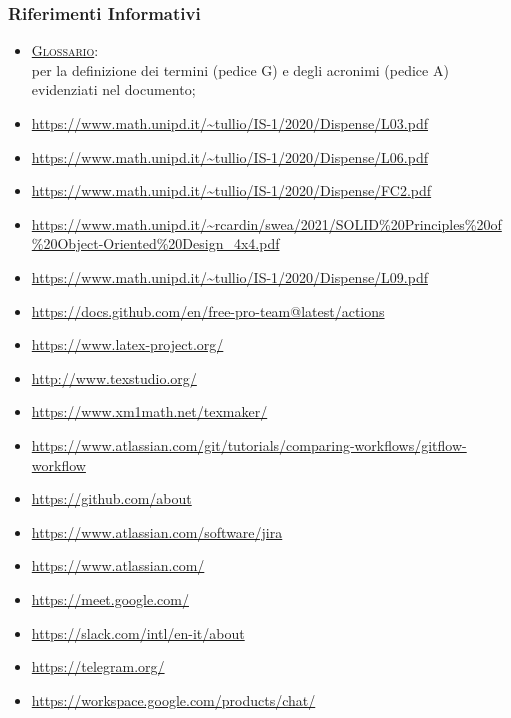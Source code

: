     \subsubsection{Riferimenti Informativi}
        \begin{itemize}
        	\item \textsc{\href{https://github.com/Three-Way-Milkshake/docs/wiki/Glossario}{Glossario}}:\\per la definizione dei termini (pedice G) e degli acronimi (pedice A) evidenziati nel documento;
            \item \url{https://www.math.unipd.it/~tullio/IS-1/2020/Dispense/L03.pdf}
            \item \url{https://www.math.unipd.it/~tullio/IS-1/2020/Dispense/L06.pdf}
            \item \url{https://www.math.unipd.it/~tullio/IS-1/2020/Dispense/FC2.pdf}
            \item \url{https://www.math.unipd.it/~rcardin/swea/2021/SOLID\%20Principles\%20of\%20Object-Oriented\%20Design_4x4.pdf}
            \item \url{https://www.math.unipd.it/~tullio/IS-1/2020/Dispense/L09.pdf}
            \item \url{https://docs.github.com/en/free-pro-team@latest/actions}
            \item \url{https://www.latex-project.org/}
            \item \url{http://www.texstudio.org/}
            \item \url{https://www.xm1math.net/texmaker/}
            \item \url{https://www.atlassian.com/git/tutorials/comparing-workflows/gitflow-workflow}
            \item \url{https://github.com/about}
            \item \url{https://www.atlassian.com/software/jira}
            \item \url{https://www.atlassian.com/}
            \item \url{https://meet.google.com/}
            \item \url{https://slack.com/intl/en-it/about}
            \item \url{https://telegram.org/}
            \item \url{https://workspace.google.com/products/chat/}
        \end{itemize}

\pagebreak

